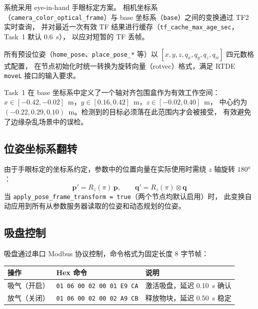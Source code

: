 \documentclass[12pt,a4paper]{article}
\begin{document}
系统采用 eye-in-hand 手眼标定方案。
相机坐标系（\texttt{camera\_color\_optical\_frame}）与 base 坐标系（\texttt{base}）之间的变换通过 TF2 实时查询，
并对最近一次有效 TF 结果进行缓存（\texttt{tf\_cache\_max\_age\_sec}，Task~1 默认 0.6~s），
以应对短暂的 TF 丢帧。

所有预设位姿（\texttt{home\_pose}、\texttt{place\_pose\_*} 等）以 $[x,y,z,q_x,q_y,q_z,q_w]$ 四元数格式配置，
在节点初始化时统一转换为旋转向量（rotvec）格式，满足 RTDE \texttt{moveL} 接口的输入要求。

\begin{infobox}[工作空间定义]
Task~1 在 base 坐标系中定义了一个轴对齐包围盒作为有效工作空间：
$x \in [-0.42, -0.02]$~m，$y \in [0.16, 0.42]$~m，$z \in [-0.02, 0.40]$~m，
中心约为 $(-0.22, 0.29, 0.10)$~m。检测到的目标必须落在此范围内才会被接受，
有效避免了边缘杂乱场景中的误检。
\end{infobox}

\subsection{位姿坐标系翻转}

由于手眼标定的坐标系约定，参数中的位置向量在实际使用时需绕 $z$ 轴旋转 $180°$：
\begin{equation}
  \bm{p}' = R_z(\pi)\,\bm{p}, \qquad
  \bm{q}' = R_z(\pi) \otimes \bm{q}
  \label{eq:frame_flip}
\end{equation}
当 \texttt{apply\_pose\_frame\_transform = true}（两个节点均默认启用）时，
此变换自动应用到所有从参数服务器读取的位姿和动态规划的位姿。

\subsection{吸盘控制}

吸盘通过串口 Modbus 协议控制，命令格式为固定长度 8 字节帧：

\begin{center}
  \begin{tabular}{lll}
    \toprule
    \textbf{操作} & \textbf{Hex 命令} & \textbf{说明} \\
    \midrule
    吸气（开启） & \texttt{01 06 00 02 00 01 E9 CA} & 激活吸盘，延迟 0.10~s 确认 \\
    放气（关闭） & \texttt{01 06 00 02 00 02 A9 CB} & 释放物块，延迟 0.50~s 稳定 \\
    \bottomrule
  \end{tabular}
\end{center}
\end{document}

